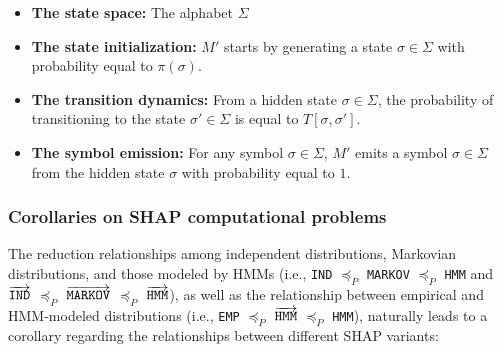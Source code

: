\begin{itemize}
    \item \textbf{The state space:} The alphabet $\Sigma$
    \item \textbf{The state initialization:} $M'$ starts by generating a state $\sigma \in \Sigma$ with probability equal to $\pi(\sigma)$.
    \item \textbf{The transition dynamics:} From a hidden state $\sigma \in \Sigma$, the probability of transitioning to the state $\sigma' \in \Sigma$ is equal to $T[\sigma, \sigma']$. 
    \item \textbf{The symbol emission:} For any symbol $\sigma \in \Sigma$, $M'$ emits a symbol $\sigma \in \Sigma$ from the hidden state $\sigma$ with probability equal to $1$.
\end{itemize}

\subsubsection{Corollaries on SHAP computational problems} 

The reduction relationships among independent distributions, Markovian distributions, and those modeled by HMMs (i.e., \texttt{IND} $\preceq_{P}$ \texttt{MARKOV} $\preceq_{P}$ \texttt{HMM} and $\overrightarrow{\texttt{IND}}$ $\preceq_{P}$ $\overrightarrow{\texttt{MARKOV}}$ $\preceq_{P}$ $\overrightarrow{\texttt{HMM}}$), as well as the relationship between empirical and HMM-modeled distributions (i.e., \texttt{EMP} $\preceq_{P}$ $\overrightarrow{\texttt{HMM}}$ $\preceq_{P}$ \texttt{HMM}), naturally leads to a corollary regarding the relationships between different SHAP variants:

